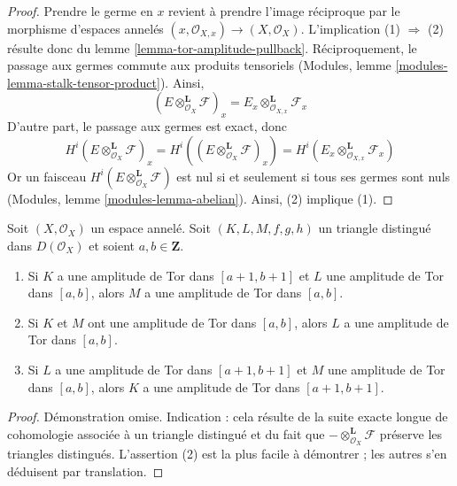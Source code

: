 \begin{proof}
Prendre le germe en $x$ revient à prendre l'image réciproque par le morphisme d'espaces annelés $(x, \mathcal{O}_{X, x}) \to (X, \mathcal{O}_X)$. L'implication (1) $\Rightarrow$ (2) résulte donc du lemme \ref{lemma-tor-amplitude-pullback}. Réciproquement, le passage aux germes commute aux produits tensoriels (Modules, lemme \ref{modules-lemma-stalk-tensor-product}). Ainsi, $$
(E \otimes_{\mathcal{O}_X}^\mathbf{L} \mathcal{F})_x =
E_x \otimes_{\mathcal{O}_{X, x}}^\mathbf{L} \mathcal{F}_x
$$ D'autre part, le passage aux germes est exact, donc $$
H^i(E \otimes_{\mathcal{O}_X}^\mathbf{L} \mathcal{F})_x =
H^i((E \otimes_{\mathcal{O}_X}^\mathbf{L} \mathcal{F})_x) =
H^i(E_x \otimes_{\mathcal{O}_{X, x}}^\mathbf{L} \mathcal{F}_x)
$$ Or un faisceau $H^i(E \otimes_{\mathcal{O}_X}^\mathbf{L} \mathcal{F})$ est nul si et seulement si tous ses germes sont nuls (Modules, lemme \ref{modules-lemma-abelian}). Ainsi, (2) implique (1).
\end{proof}
\begin{lemma}

\label{lemma-cone-tor-amplitude}

Soit $(X, \mathcal{O}_X)$ un espace annelé. Soit $(K, L, M, f, g, h)$ un triangle distingué dans $D(\mathcal{O}_X)$ et soient $a, b \in \mathbf{Z}$.

\begin{enumerate}

\item Si $K$ a une amplitude de Tor dans $[a + 1, b + 1]$ et
$L$ une amplitude de Tor dans $[a, b]$, alors $M$ a une amplitude de Tor dans $[a, b]$.
\item Si $K$ et $M$ ont une amplitude de Tor dans $[a, b]$, alors
$L$ a une amplitude de Tor dans $[a, b]$.
\item Si $L$ a une amplitude de Tor dans $[a + 1, b + 1]$
et $M$ une amplitude de Tor dans $[a, b]$, alors
$K$ a une amplitude de Tor dans $[a + 1, b + 1]$.

\end{enumerate}

\end{lemma}

\begin{proof}

Démonstration omise. Indication : cela résulte de la suite exacte longue de cohomologie associée à un triangle distingué et du fait que
$- \otimes_{\mathcal{O}_X}^{\mathbf{L}} \mathcal{F}$
préserve les triangles distingués. L'assertion (2) est la plus facile à démontrer ; les autres s'en déduisent par translation.

\end{proof}


